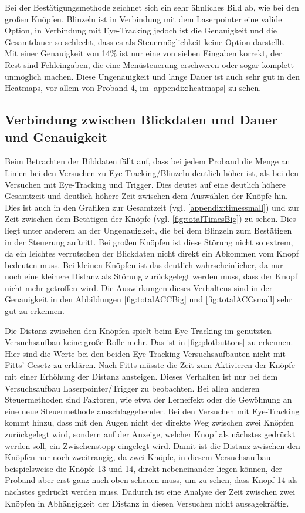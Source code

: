 Bei der Bestätigungsmethode zeichnet sich ein sehr ähnliches Bild ab, wie bei den großen Knöpfen. Blinzeln ist in Verbindung mit dem Laserpointer eine valide Option, in Verbindung mit Eye-Tracking jedoch ist die Genauigkeit und die Gesamtdauer so schlecht, dass es als Steuermöglichkeit keine Option darstellt. Mit einer Genauigkeit von 14\% ist nur eine von sieben Eingaben korrekt, der Rest sind Fehleingaben, die eine Menüsteuerung erschweren oder sogar komplett unmöglich machen. Diese Ungenauigkeit und lange Dauer ist auch sehr gut in den Heatmaps, vor allem von Proband 4, im \autoref{appendix:heatmaps} zu sehen.

\subsection{Verbindung zwischen Blickdaten und Dauer und Genauigkeit}
\label{section:heatmapsAnalysis}
Beim Betrachten der Bilddaten fällt auf, dass bei jedem Proband die Menge an Linien bei den Versuchen zu Eye-Tracking/Blinzeln deutlich höher ist, als bei den Versuchen mit Eye-Tracking und Trigger. Dies deutet auf eine deutlich höhere Gesamtzeit und deutlich höhere Zeit zwischen dem Auswählen der Knöpfe hin. Dies ist auch in den Grafiken zur Gesamtzeit (vgl. \autoref{appendix:timessmall}) und zur Zeit zwischen dem Betätigen der Knöpfe (vgl. \autoref{fig:totalTimesBig}) zu sehen. Dies liegt unter anderem an der Ungenauigkeit, die bei dem Blinzeln zum Bestätigen in der Steuerung auftritt. Bei großen Knöpfen ist diese Störung nicht so extrem, da ein leichtes verrutschen der Blickdaten nicht direkt ein Abkommen vom Knopf bedeuten muss. Bei kleinen Knöpfen ist das deutlich wahrscheinlicher, da nur noch eine kleinere Distanz als Störung zurückgelegt werden muss, dass der Knopf nicht mehr getroffen wird. Die Auswirkungen dieses Verhaltens sind in der Genauigkeit in den Abbildungen \ref{fig:totalACCBig} und \ref{fig:totalACCsmall} sehr gut zu erkennen. 

Die Distanz zwischen den Knöpfen spielt beim Eye-Tracking im genutzten Versuchsaufbau keine große Rolle mehr. Das ist in \autoref{fig:plotbuttons} zu erkennen. Hier sind die Werte bei den beiden Eye-Tracking Versuchsaufbauten nicht mit Fitts' Gesetz zu erklären. Nach Fitts müsste die Zeit zum Aktivieren der Knöpfe mit einer Erhöhung der Distanz ansteigen. Dieses Verhalten ist nur bei dem Versuchsaufbau Laserpointer/Trigger zu beobachten. Bei allen anderen Steuermethoden sind Faktoren, wie etwa der Lerneffekt oder die Gewöhnung an eine neue Steuermethode ausschlaggebender. Bei den Versuchen mit Eye-Tracking kommt hinzu, dass mit den Augen nicht der direkte Weg zwischen zwei Knöpfen zurückgelegt wird, sondern auf der Anzeige, welcher Knopf als nächstes gedrückt werden soll, ein Zwischenstopp eingelegt wird. Damit ist die Distanz zwischen den Knöpfen nur noch zweitrangig, da zwei Knöpfe, in diesem Versuchsaufbau beispielsweise die Knöpfe 13 und 14, direkt nebeneinander liegen können, der Proband aber erst ganz nach oben schauen muss, um zu sehen, dass Knopf 14 als nächstes gedrückt werden muss. Dadurch ist eine Analyse der Zeit zwischen zwei Knöpfen in Abhängigkeit der Distanz in diesen Versuchen nicht aussagekräftig.

